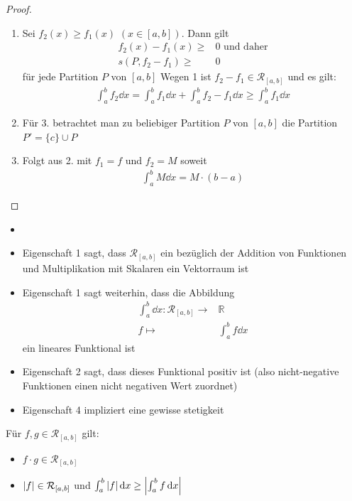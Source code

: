 \begin{proof}
\begin{enumerate}
		\item Sei $f_2(x) \geq f_1(x)$ $(x \in [a,b])$. Dann gilt
		\begin{align*}		
			f_2(x) - f_1(x) \geq & 0 \text{ und daher} \\
			s(P, f_2 -f_1) \geq & 0
		\end{align*} 
		 für jede Partition $P$ von $[a,b]$ 
		Wegen 1 ist $f_2 -f_1 \in \mathcal{R}_{[a,b]}$ und es gilt:
		\begin{align*}
			\int_a^b f_2 \dd{x} = \int_a^b f_1 \dd{x} + \int_a^bf_2-f_1 \dd{x} 
			\geq \int_a^b f_1 \dd{x}
	\end{align*}		 
	\item Für 3. betrachtet man zu beliebiger Partition $P$ von $[a,b]$ die Partition \linebreak
	$P' = \{c\} \cup P$
	\item Folgt aus 2. mit $f_1 = f$ und $f_2 = M$ soweit 
	\begin{align*}
		\int_a^b M \dd{x} = M \cdot (b-a)
	\end{align*}		
	\end{enumerate}
\end{proof}

\begin{Bemerkung}{
	\begin{itemize}
	 	\item[ ]
		\item Eigenschaft 1 sagt, dass $\mathcal{R}_{[a,b]}$ ein bezüglich der Addition von 
		Funktionen und Multiplikation mit Skalaren ein Vektorraum ist
		\item Eigenschaft 1 sagt weiterhin, dass die Abbildung 
		\begin{align*}
			\int_a^b \dd{x} : \mathcal{R}_{[a,b]} \rightarrow  & \mathbb{R} \\
			f \mapsto & \int_a^b f\dd{x}
		\end{align*}
		ein lineares Funktional ist
		\item Eigenschaft 2 sagt, dass dieses Funktional positiv ist
		(also nicht-negative Funktionen einen nicht negativen Wert zuordnet)
		\item Eigenschaft 4 impliziert eine gewisse stetigkeit
	\end{itemize}
}\end{Bemerkung}

\begin{Satz}{
	Für $f,g \in \mathcal{R}_{[a,b]}$ gilt:
	\begin{itemize}
		\item $f \cdot g \in \mathcal{R}_{[a,b]}$
		\item $\abs{f} \in \mathcal{R}_{[a,b]}$ und $\int_a^b \abs{f} \dd{x} 
		\geq \abs{\int_a^b f \dd{x}}$
	\end{itemize}
}\end{Satz}

